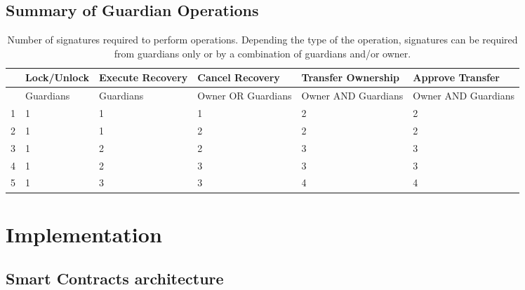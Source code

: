 \documentclass[12pt]{article}
\begin{document}
\subsection{Summary of Guardian Operations}
\begin{table}[ht]
    \begin{tabular}{ |c|m{6em}|m{6em}|m{6em}|m{6em}|m{6em}| }
     \hline
       & Lock/Unlock & Execute \newline Recovery & Cancel  \newline Recovery & Transfer Ownership & Approve Transfer \\
     \hline \hline
       & Guardians & Guardians & Owner OR Guardians & Owner AND Guardians & Owner AND Guardians \\
     \hline
     1 & 1 & 1 & 1 & 2 & 2 \\
     2 & 1 & 1 & 2 & 2 & 2 \\
     3 & 1 & 2 & 2 & 3 & 3 \\
     4 & 1 & 2 & 3 & 3 & 3 \\
     5 & 1 & 3 & 3 & 4 & 4 \\
     \hline

    \end{tabular}
    \caption{Number of signatures required to perform operations. Depending the type of the operation, signatures can be required from guardians only or by a combination of guardians and/or owner.}
\end{table}

\section{Implementation}

\subsection{Smart Contracts architecture}
\end{document}
